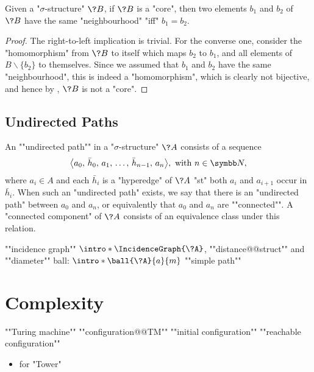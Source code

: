 \begin{proposition}
	\AP\label{prop:neighbourhood-core}
	Given a "$\sigma$-structure" $\?B$, if $\?B$ is a "core", then
	two elements $b_1$ and $b_2$ of $\?B$ have the same "neighbourhood" "iff" $b_1 = b_2$.
\end{proposition}

\begin{proof}
	The right-to-left implication is trivial.
	For the converse one, consider the "homomorphism" from $\?B$ to itself
	which maps $b_2$ to $b_1$, and all elements of $B \smallsetminus \{b_2\}$
	to themselves. Since we assumed that $b_1$ and $b_2$ have the same "neighbourhood",
	this is indeed a "homomorphism", which is clearly not bijective, and
	hence by , $\?B$ is not a "core".
\end{proof}

\subsection{Undirected Paths}

An \AP""undirected path"" in a "$\sigma$-structure" $\?A$ consists of a sequence
\[\big\langle a_0,\, \bar h_0,\, a_1,\, \hdots,\, \bar h_{n-1},\, a_n\big\rangle, \text{ with } n \in \N,\]
where $a_i \in A$ and each $\bar h_i$ is a "hyperedge" of $\?A$ "st" both
$a_i$ and $a_{i+1}$ occur in $\bar h_i$. When such an "undirected path" exists, we say that
there is an "undirected path" between $a_0$ and $a_n$, or equivalently
that $a_0$ and $a_n$ are \AP""connected"".%
A \AP"connected component" of $\?A$ consists of an equivalence class under this relation.

\begin{itemize}
	\itemAP ""incidence graph"" $\intro*\IncidenceGraph{\?A}$, ""distance@@struct"" and ""diameter""
	\itemAP ball: $\intro*\ball{\?A}{a}{m}$
	\itemAP ""simple path""
\end{itemize}

\section{Complexity}

\begin{itemize}
	\itemAP ""Turing machine""
	\itemAP ""configuration@@TM""
	\itemAP ""initial configuration""
	\itemAP ""reachable configuration""
\end{itemize}

\begin{itemize}
	\itemAP ""Connectivity in Finite Graphs""
	\itemAP ""Reachability in Finite Graphs""
	\itemAP ""computationally equivalent""
	\itemAP ""data complexity""
	\item \cite{Schmitz2016ComplexityHierarchies} for "Tower"
\end{itemize}